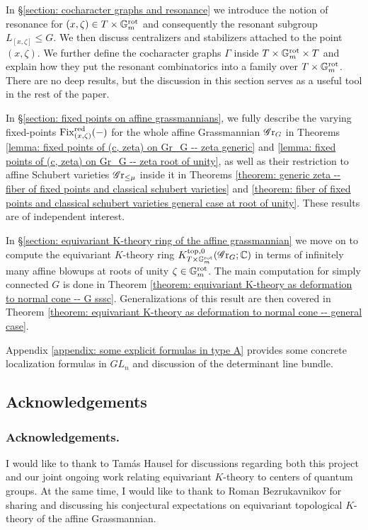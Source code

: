 In \S \ref{section: cocharacter graphs and resonance} we introduce the notion of resonance for $(x, \zeta) \in T \times \mathbb{G}_m^{\mathrm{rot}}$ and consequently the resonant subgroup $L_{[x, \zeta]} \leq G$. We then discuss centralizers and stabilizers attached to the point $(x, \zeta)$. We further define the {cocharacter graphs} $\Gamma$ inside $T \times \mathbb{G}_m^{\mathrm{rot}} \times T$ and explain how they put the resonant combinatorics into a family over $T \times \mathbb{G}_m^{\mathrm{rot}}$. There are no deep results, but the discussion in this section serves as a useful tool in the rest of the paper.


In \S \ref{section: fixed points on affine grassmannians}, we fully describe the varying fixed-points $\operatorname{Fix}^{\operatorname{red}}_{(x, \zeta)}(-)$ for the whole affine Grassmannian $\operatorname{\mathscr{G}r}_G$ in Theorems \ref{lemma: fixed points of (c, zeta) on Gr_G -- zeta generic} and \ref{lemma: fixed points of (c, zeta) on Gr_G -- zeta root of unity}, as well as their restriction to affine Schubert varieties $\operatorname{\mathscr{G}r}_{\leq \mu}$ inside it in Theorems \ref{theorem: generic zeta -- fiber of fixed points and classical schubert varieties} and \ref{theorem: fiber of fixed points and classical schubert varieties general case at root of unity}. These results are of independent interest.



In \S \ref{section: equivariant K-theory ring of the affine grassmannian} we move on to compute the equivariant $K$-theory ring $K^{\mathrm{top}, 0}_{T \times \mathbb{G}_m^{\mathrm{rot}}}(\operatorname{\mathscr{G}r}_G; \operatorname{\mathbb{C}})$ in terms of infinitely many affine blowups at roots of unity $\zeta \in \mathbb{G}_m^{\mathrm{rot}}$. The main computation for simply connected $G$ is done in Theorem \ref{theorem: equivariant K-theory as deformation to normal cone -- G sssc}. Generalizations of this result are then covered in Theorem \ref{theorem: equivariant K-theory as deformation to normal cone -- general case}.

Appendix \ref{appendix: some explicit formulas in type A} provides some concrete localization formulas in $GL_n$ and discussion of the determinant line bundle.


\subsection{Acknowledgements}

\subsubsection{Acknowledgements.}
I would like to thank to Tamás Hausel for discussions regarding both this project and our joint ongoing work relating equivariant $K$-theory to centers of quantum groups.
At the same time, I would like to thank to Roman Bezrukavnikov for sharing and discussing his conjectural expectations on equivariant topological $K$-theory of the affine Grassmannian.

